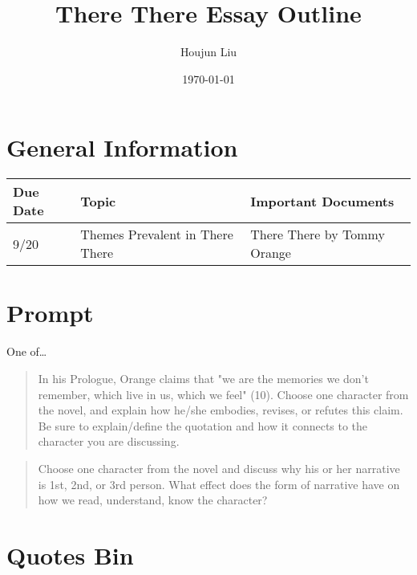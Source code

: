 \documentclass[letterpaper]{article}
\author{Houjun Liu}
\date{\today}
\title{There There Essay Outline}
\renewcommand\maketitle{}
\begin{document}
\maketitle
{}

\section{General Information}
\label{sec:org2b49bec}
\begin{center}
\begin{tabular}{lll}
Due Date & Topic & Important Documents\\
\hline
9/20 & Themes Prevalent in There There & There There by Tommy Orange\\
\end{tabular}
\end{center}

\section{Prompt}
\label{sec:org3f730fe}
One of\ldots{}

\begin{quote}
In his Prologue, Orange claims that "we are the memories we don’t remember, which live in us, which we feel" (10). Choose one character from the novel, and explain how he/she embodies, revises, or refutes this claim. Be sure to explain/define the quotation and how it connects to the character you are discussing.
\end{quote}

\begin{quote}
Choose one character from the novel and discuss why his or her narrative is 1st, 2nd, or 3rd person. What effect does the form of narrative have on how we read, understand, know the character?
\end{quote}

\section{Quotes Bin}
\label{sec:org69a4703}
\end{document}
